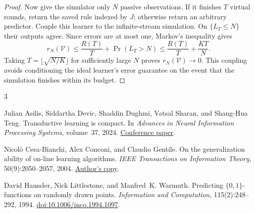 \documentclass[11pt]{article}
\newcommand{\V}{\mathcal V}
\begin{document}
\begin{proof}
Now give the simulator only $N$ passive observations. If it finishes $T$
virtual rounds, return the saved rule indexed by $J$; otherwise return an
arbitrary predictor. Couple this learner to the infinite-stream simulation.
On $\{L_T\le N\}$ their outputs agree. Since errors are at most one,
Markov's inequality gives
\[
r_N(\V)
\le\frac{R(T)}{T}+\Pr(L_T>N)
\le\frac{R(T)}{T}+\frac{KT}{N}.
\]
Taking $T=\lfloor\sqrt{N/K}\rfloor$ for sufficiently large $N$ proves
$r_N(\V)\to0$. This coupling avoids conditioning the ideal learner's
error guarantee on the event that the simulation finishes within its
budget.
\end{proof}

\begin{thebibliography}{3}

Julian Asilis, Siddartha Devic, Shaddin Dughmi, Vatsal Sharan, and
Shang-Hua Teng.
\newblock Transductive learning is compact.
\newblock In \emph{Advances in Neural Information Processing Systems},
volume~37, 2024.
\newblock \href{https://proceedings.neurips.cc/paper_files/paper/2024/file/eb7295a8bc613b375726659c2ecd6f14-Paper-Conference.pdf}{Conference paper}.

Nicol\`o Cesa-Bianchi, Alex Conconi, and Claudio Gentile.
\newblock On the generalization ability of on-line learning algorithms.
\newblock \emph{IEEE Transactions on Information Theory}, 50(9):2050--2057,
2004.
\newblock \href{https://cesa-bianchi.di.unimi.it/Pubblicazioni/J20.pdf}{Author's copy}.

David Haussler, Nick Littlestone, and Manfred~K. Warmuth.
\newblock Predicting $\{0,1\}$-functions on randomly drawn points.
\newblock \emph{Information and Computation}, 115(2):248--292, 1994.
\newblock \href{https://doi.org/10.1006/inco.1994.1097}{doi:10.1006/inco.1994.1097}.

\end{thebibliography}
\end{document}

